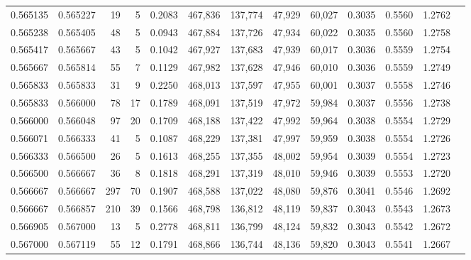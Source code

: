 \begin{tabular}{rrrrrrrrrrrrr}
0.565135 & 0.565227 &    19 &   5 &                                     0.2083 & 467,836 & 137,774 &  47,929 &  60,027 & 0.3035 & 0.5560 & 1.2762 \\
0.565238 & 0.565405 &    48 &   5 &                                     0.0943 & 467,884 & 137,726 &  47,934 &  60,022 & 0.3035 & 0.5560 & 1.2758 \\
0.565417 & 0.565667 &    43 &   5 &                                     0.1042 & 467,927 & 137,683 &  47,939 &  60,017 & 0.3036 & 0.5559 & 1.2754 \\
0.565667 & 0.565814 &    55 &   7 &                                     0.1129 & 467,982 & 137,628 &  47,946 &  60,010 & 0.3036 & 0.5559 & 1.2749 \\
0.565833 & 0.565833 &    31 &   9 &                                     0.2250 & 468,013 & 137,597 &  47,955 &  60,001 & 0.3037 & 0.5558 & 1.2746 \\
0.565833 & 0.566000 &    78 &  17 &                                     0.1789 & 468,091 & 137,519 &  47,972 &  59,984 & 0.3037 & 0.5556 & 1.2738 \\
0.566000 & 0.566048 &    97 &  20 &                                     0.1709 & 468,188 & 137,422 &  47,992 &  59,964 & 0.3038 & 0.5554 & 1.2729 \\
0.566071 & 0.566333 &    41 &   5 &                                     0.1087 & 468,229 & 137,381 &  47,997 &  59,959 & 0.3038 & 0.5554 & 1.2726 \\
0.566333 & 0.566500 &    26 &   5 &                                     0.1613 & 468,255 & 137,355 &  48,002 &  59,954 & 0.3039 & 0.5554 & 1.2723 \\
0.566500 & 0.566667 &    36 &   8 &                                     0.1818 & 468,291 & 137,319 &  48,010 &  59,946 & 0.3039 & 0.5553 & 1.2720 \\
0.566667 & 0.566667 &   297 &  70 &                                     0.1907 & 468,588 & 137,022 &  48,080 &  59,876 & 0.3041 & 0.5546 & 1.2692 \\
0.566667 & 0.566857 &   210 &  39 &                                     0.1566 & 468,798 & 136,812 &  48,119 &  59,837 & 0.3043 & 0.5543 & 1.2673 \\
0.566905 & 0.567000 &    13 &   5 &                                     0.2778 & 468,811 & 136,799 &  48,124 &  59,832 & 0.3043 & 0.5542 & 1.2672 \\
0.567000 & 0.567119 &    55 &  12 &                                     0.1791 & 468,866 & 136,744 &  48,136 &  59,820 & 0.3043 & 0.5541 & 1.2667 \\

\end{tabular}
